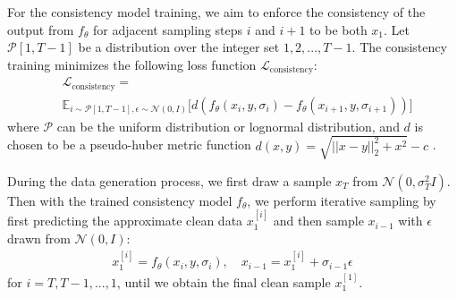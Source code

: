 For the consistency model training, we aim to enforce the consistency of the output from $f_\theta$ for adjacent sampling steps $i$ and $i+1$ to be both $x_1$.
Let $\mathcal{P}[1,T-1]$ be a distribution over the integer set ${1, 2, ..., T-1}$.
The consistency training minimizes the following loss function $\mathcal{L}_{\text{consistency}}$:
\begin{align}\label{eq: consistency training loss}
    &\mathcal{L}_{\text{consistency}} =  \nonumber \\ &\mathbb{E}_{i \sim \mathcal{P}[1,T-1], \epsilon \sim \mathcal{N}(0, I)} \bigl[d(f_{\theta}(x_i, y, \sigma_i) - f_{\theta}(x_{i+1}, y, \sigma_{i+1}))\bigr]
\end{align}
where $\mathcal{P}$ can be the uniform distribution or lognormal distribution, and $d$ is chosen to be a pseudo-huber metric function $d(x,y) = \sqrt{||x-y||_2^2 + x^2} - c$ \citep{song2023improved}.

During the data generation process, we first draw a sample $x_T$ from $\mathcal{N}(0, \sigma_T^2 I)$.
Then with the trained consistency model $f_{\theta}$, we perform iterative sampling by first predicting the approximate clean data $x_1^{[i]}$ and then sample $x_{i-1}$ with $\epsilon$ drawn from $\mathcal{N}(0, I)$:
\begin{align} \label{eq: consistency sampling}
    x_1^{[i]} = f_{\theta}(x_i, y, \sigma_i), \quad x_{i-1} = x_1^{[i]} + \sigma_{i-1} \epsilon
\end{align}
for $i = T, T-1, ..., 1$, until we obtain the final clean sample $x_1^{[1]}$.

